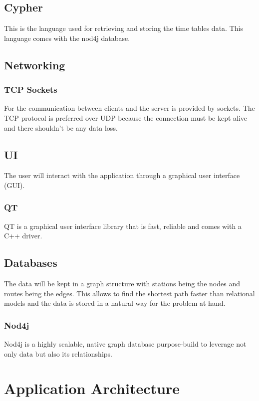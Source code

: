 \documentclass{llncs}
\begin{document}
			\subsection{Cypher}
				This is the language used for retrieving and storing the time tables data. This language comes with the nod4j database.
		\subsection{Networking}
			\subsubsection{TCP Sockets}
			For the communication between clients and the server is provided by sockets. The TCP protocol is preferred over UDP because the connection must be kept alive and there shouldn't be any data loss.
		\subsection{UI}
			The user will interact with the application through a graphical user interface (GUI).
			\subsubsection{QT}
				QT is a graphical user interface library that is fast, reliable and comes with a C++ driver.
		\subsection{Databases}
			The data will be kept in a graph structure with stations being the nodes and routes being the edges. This allows to find the shortest path faster than relational models and the data is stored in a natural way for the problem at hand. 
			\subsubsection{Nod4j} 
				Nod4j is a highly scalable, native graph database purpose-build to leverage not only data but also its relationships.
	\section{Application Architecture}
\end{document}
